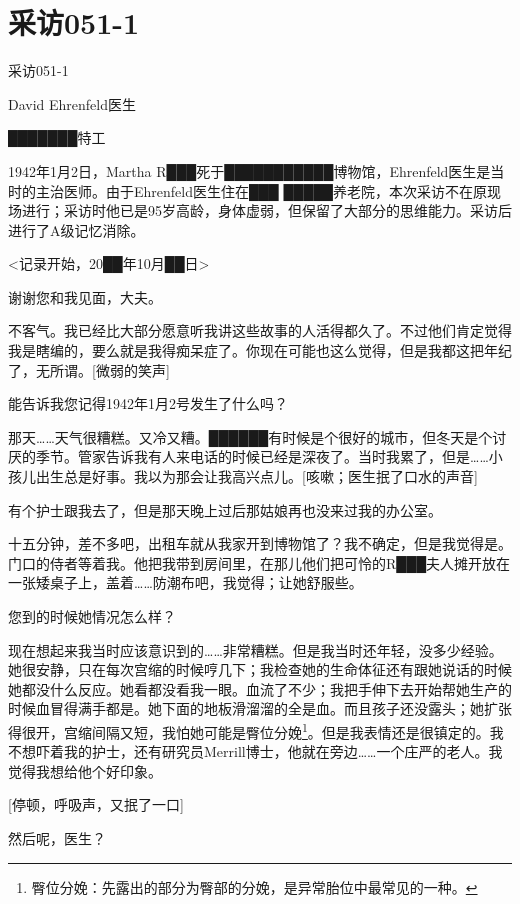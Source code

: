 \chapter{
    采访051-1
}

\label{chap:DOC-interview-051-1}

采访051-1

David Ehrenfeld医生

███████特工

1942年1月2日，Martha R███死于███████████博物馆，Ehrenfeld医生是当时的主治医师。由于Ehrenfeld医生住在███ █████养老院，本次采访不在原现场进行；采访时他已是95岁高龄，身体虚弱，但保留了大部分的思维能力。采访后进行了A级记忆消除。

<记录开始，20██年10月██日>

谢谢您和我见面，大夫。

不客气。我已经比大部分愿意听我讲这些故事的人活得都久了。不过他们肯定觉得我是瞎编的，要么就是我得痴呆症了。你现在可能也这么觉得，但是我都这把年纪了，无所谓。{[}微弱的笑声]

能告诉我您记得1942年1月2号发生了什么吗？

那天……天气很糟糕。又冷又糟。██████有时候是个很好的城市，但冬天是个讨厌的季节。管家告诉我有人来电话的时候已经是深夜了。当时我累了，但是……小孩儿出生总是好事。我以为那会让我高兴点儿。{[}咳嗽；医生抿了口水的声音]

有个护士跟我去了，但是那天晚上过后那姑娘再也没来过我的办公室。

十五分钟，差不多吧，出租车就从我家开到博物馆了？我不确定，但是我觉得是。门口的侍者等着我。他把我带到房间里，在那儿他们把可怜的R███夫人摊开放在一张矮桌子上，盖着……防潮布吧，我觉得；让她舒服些。

您到的时候她情况怎么样？

现在想起来我当时应该意识到的……非常糟糕。但是我当时还年轻，没多少经验。她很安静，只在每次宫缩的时候哼几下；我检查她的生命体征还有跟她说话的时候她都没什么反应。她看都没看我一眼。血流了不少；我把手伸下去开始帮她生产的时候血冒得满手都是。她下面的地板滑溜溜的全是血。而且孩子还没露头；她扩张得很开，宫缩间隔又短，我怕她可能是臀位分娩\footnote{臀位分娩：先露出的部分为臀部的分娩，是异常胎位中最常见的一种。}。但是我表情还是很镇定的。我不想吓着我的护士，还有研究员Merrill博士，他就在旁边……一个庄严的老人。我觉得我想给他个好印象。

{[}停顿，呼吸声，又抿了一口]

然后呢，医生？

